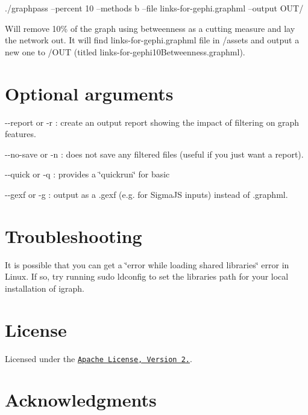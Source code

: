 \begin{DoxyCode}
./graphpass --percent 10 --methods b --file links-for-gephi.graphml --output OUT/
\end{DoxyCode}


Will remove 10\% of the graph using betweenness as a cutting measure and lay the network out. It will find {\ttfamily links-\/for-\/gephi.\+graphml} file in {\ttfamily /assets} and output a new one to {\ttfamily /\+O\+UT} (titled {\ttfamily links-\/for-\/gephi10\+Betweenness.\+graphml}).

\section*{Optional arguments}


\begin{DoxyItemize}
\item {\ttfamily -\/-\/report} or {\ttfamily -\/r} \+: create an output report showing the impact of filtering on graph features.
\item {\ttfamily -\/-\/no-\/save} or {\ttfamily -\/n} \+: does not save any filtered files (useful if you just want a report).
\item {\ttfamily -\/-\/quick} or {\ttfamily -\/q} \+: provides a \char`\"{}quickrun\char`\"{} for basic
\item {\ttfamily -\/-\/gexf} or {\ttfamily -\/g} \+: output as a .gexf (e.\+g. for Sigma\+JS inputs) instead of .graphml.
\end{DoxyItemize}

\section*{Troubleshooting}

It is possible that you can get a \char`\"{}error while loading shared libraries\char`\"{} error in Linux. If so, try running {\ttfamily sudo ldconfig} to set the libraries path for your local installation of igraph.

\section*{License}

Licensed under the \href{http://www.apache.org/licenses/LICENSE-2.0}{\tt Apache License, Version 2.}.

\section*{Acknowledgments}

